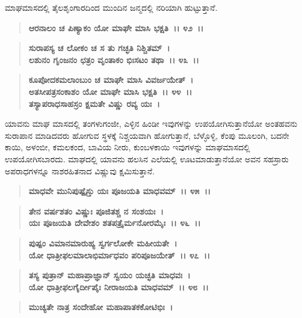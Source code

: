 ಮಾಘಮಾಸದಲ್ಲಿ ತೈಲಶೃಂಗಾರದಿಂದ ಮುಂದಿನ ಜನ್ಮದಲ್ಲಿ ನರಿಯಾಗಿ ಹುಟ್ಟುತ್ತಾನೆ.

\begin{verse}
\textbf{ಆರನಾಲಂ ಚ ಪಿಣ್ಯಾಕಂ ಯೋ ಮಾಘೇ ಮಾಸಿ ಭಕ್ಷತಿ~।। ೪೨~।।}
\end{verse}

\begin{verse}
\textbf{ಸುರಾಪಸ್ಯ ಚ ಲೋಕಂ ಚ ಸ ತು ಗಚ್ಛತಿ ನಿಶ್ಚಿತಮ್~।}\\\textbf{ಲಶುನಂ ಗೃಂಜನಂ ಛತ್ರಂ ವೃಂತಾಕಂ ಭಿಃಸಟಂ ತಥಾ~।। ೪೩~।। }
\end{verse}

\begin{verse}
\textbf{ಕೂಪೋದಕಮಲಾಂಬುಂ ಚ ಮಾಘೇ ಮಾಸಿ ವಿವರ್ಜಯೇತ್~।}\\\textbf{ಅತಸೀಪತ್ರಸಂಕಾಶಂ ಯೋ ಮಾಘೇ ಮಾಸಿ ಭಕ್ಷತಿ~।। ೪೪~।। }\\\textbf{ತಸ್ಯಾಪರಾಧಸಾಹಸ್ರಂ ಕ್ಷಮತೇ ವಿಷ್ಣು ರವ್ಯ ಯಃ~।}
\end{verse}

ಯಾವನು ಮಾಘ ಮಾಸದಲ್ಲಿ ತಂಗಳುಗಂಜೀ, ಎಳ್ಳಿನ ಹಿಂಡೀ ಇವುಗಳನ್ನು ಉಪಯೋಗಿಸುತ್ತಾನೆಯೋ ಅಂತಹವನು ಸುರಾಪಾನ ಮಾಡಿದವರು ಹೋಗುವ ಸ್ಥಳಕ್ಕೆ ನಿಶ್ಚಯವಾಗಿ ಹೋಗುತ್ತಾನೆ, ಬೆಳ್ಳೊಳ್ಳಿ, ಕೆಂಪು ಮೂಲಂಗಿ, ಬದನೇ ಕಾಯಿ, ಅಳಂಬೀ, ಕಮಲಕಂದ, ಬಾವಿಯ ನೀರು, ಕುಂಬಳಕಾಯಿ ಇವುಗಳನ್ನು ಮಾಘಮಾಸದಲ್ಲಿ ಉಪಯೋಗಿಸಬಾರದು. ಮಾಘದಲ್ಲಿ ಯಾವನು ಹಲಸಿನ ಎಲೆಯಲ್ಲಿ ಊಟಮಾಡುತ್ತಾನೆಯೋ ಅವನ ಸಹಸ್ರಾರು ಅಪರಾಧಗಳನ್ನೂ ನಾಶರಹಿತನಾದ ವಿಷ್ಣುವು ಕ್ಷಮಿಸುತ್ತಾನೆ.

\begin{verse}
\textbf{ಮಾಧವೇ ಮುನಿಪುಷ್ಪೈಸ್ತು ಯಃ ಪೂಜಯತಿ ಮಾಧವಮ್~।। ೪೫~।। }
\end{verse}

\begin{verse}
\textbf{ತೇನ ವರ್ಷಶತಂ ವಿಷ್ಣುಃ ಪೂಜಿತಶ್ಚ ನ ಸಂಶಯಃ~।}\\\textbf{ಯಃ ಪೂಜಯತಿ ದೇವೇಶಂ ಶತಪತ್ರೈರ್ಮನೋರಮೈಃ~।। ೪೬~।। }
\end{verse}

\begin{verse}
\textbf{ಪುಷ್ಪಂ ವಿಮಾನಮಾರುಹ್ಯ ಸ್ವರ್ಗಲೋಕೇ ಮಹೀಯತೇ~।}\\\textbf{ಯೋ ಧಾತ್ರೀಫಲಮಾಲಾಭಿರ್ಮಾಧವಂ ಪರಿಪೂಜಯೇತ್~।। ೪೭~।। }
\end{verse}

\begin{verse}
\textbf{ತಸ್ಯ ಪುತ್ರಾನ್ ಮಹಾಪ್ರಾಜ್ಞಾನ್ ಸ್ವಯಂ ಯಚ್ಛತಿ ಮಾಧವಃ~।}\\\textbf{ಯೋ ಧಾತ್ರೀಫಲಗೈರ್ದೀಪೈಃ ನೀರಾಜಯತಿ ಮಾಧವಮ್~।। ೪೮~।। }
\end{verse}

\begin{verse}
\textbf{ಮುಚ್ಯತೇ ನಾತ್ರ ಸಂದೇಹೋ ಮಹಾಪಾತಕಕೋಟಿಭಿಃ~।}
\end{verse}

